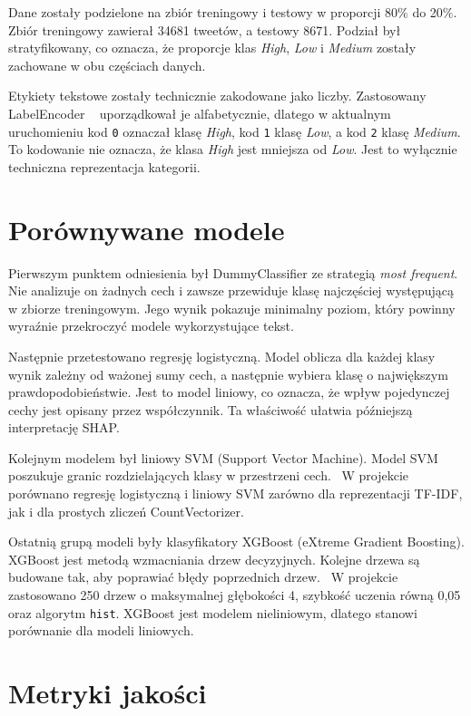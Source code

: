 \documentclass[12pt, a4paper, oneside]{scrreprt}
\begin{document}
Dane zostały podzielone na zbiór treningowy i testowy w proporcji 80\% do 20\%.
Zbiór treningowy zawierał \num{34681} tweetów, a testowy \num{8671}.
Podział był stratyfikowany, co oznacza, że proporcje klas \emph{High}, \emph{Low} i \emph{Medium}
zostały zachowane w obu częściach danych.

Etykiety tekstowe zostały technicznie zakodowane jako liczby. Zastosowany LabelEncoder ~\cite{LabelEncoderGFG}
uporządkował je alfabetycznie, dlatego w aktualnym uruchomieniu kod \texttt{0} oznaczał
klasę \emph{High}, kod \texttt{1} klasę \emph{Low}, a kod \texttt{2} klasę \emph{Medium}.
To kodowanie nie oznacza, że klasa \emph{High} jest mniejsza od \emph{Low}.
Jest to wyłącznie techniczna reprezentacja kategorii.

\section{Porównywane modele}

Pierwszym punktem odniesienia był DummyClassifier ze strategią \emph{most frequent}.
Nie analizuje on żadnych cech i zawsze przewiduje klasę najczęściej występującą w
zbiorze treningowym. Jego wynik pokazuje minimalny poziom, który powinny wyraźnie
przekroczyć modele wykorzystujące tekst.~\cite{DummyClassifierGFG}

Następnie przetestowano regresję logistyczną.
Model oblicza dla każdej klasy wynik zależny od ważonej sumy cech, a następnie wybiera klasę o największym prawdopodobieństwie.
Jest to model liniowy, co oznacza, że wpływ pojedynczej cechy jest opisany przez współczynnik.
Ta właściwość ułatwia późniejszą interpretację SHAP.~\cite{LogisticRegression}

Kolejnym modelem był liniowy SVM (Support Vector Machine).
Model SVM poszukuje granic rozdzielających klasy w przestrzeni cech.~\cite{SVM}
W projekcie porównano regresję logistyczną i liniowy SVM zarówno dla
reprezentacji TF-IDF, jak i dla prostych zliczeń CountVectorizer.

Ostatnią grupą modeli były klasyfikatory XGBoost (eXtreme Gradient Boosting). XGBoost jest
metodą wzmacniania drzew decyzyjnych. Kolejne drzewa są budowane tak,
aby poprawiać błędy poprzednich drzew.~\cite{XGBoost} W projekcie
zastosowano 250 drzew o maksymalnej głębokości 4, szybkość uczenia
równą 0,05 oraz algorytm \texttt{hist}. XGBoost jest modelem nieliniowym,
dlatego stanowi porównanie dla modeli liniowych.

\section{Metryki jakości}
\end{document}
